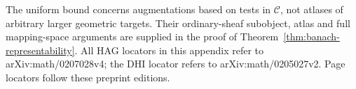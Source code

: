 \documentclass[12pt]{amsart}
\theoremstyle{definition}
\theoremstyle{remark}
\numberwithin{equation}{section}
\begin{document}
The uniform bound concerns augmentations based on
tests in $\mathcal C$, not atlases of arbitrary
larger geometric targets. Their ordinary-sheaf
subobject, atlas and full mapping-space arguments
are supplied in the proof of
Theorem~\ref{thm:banach-representability}.
All HAG locators in this appendix refer to
arXiv:math/0207028v4; the DHI locator refers to
arXiv:math/0205027v2. Page locators follow these
preprint editions.


\printbibliography
\end{document}
